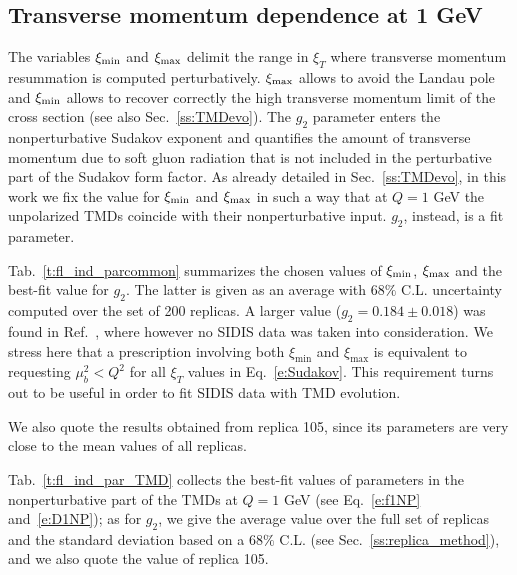 \documentclass[aps,preprintnumbers,showpacs,nofootinbib,superscriptaddress,floatfix]{revtex4}
\newcommand{\AS}[1]{{\textcolor[rgb]{1,0,1}{#1}}}
\newcommand{\T}{\perp}
\newcommand{\bT}{\xi_T}
\newcommand{\bb}{\xi}
\begin{document}
\subsection{Transverse momentum dependence at 1 GeV}
\label{ss:bestfit_TMDs}

The variables $\bb_{\rm min}$ and $\bb_{\rm max}$ delimit the range in $\bT$ where transverse momentum resummation is computed perturbatively. $\bb_{\rm max}$ allows to avoid the Landau pole and $\bb_{\rm min}$ allows to recover correctly the high transverse momentum limit of the cross section (see also Sec.~\ref{ss:TMDevo}).
The $g_2$ parameter enters the nonperturbative Sudakov exponent and
quantifies the amount of transverse momentum 
due to soft gluon radiation that is not included in the
perturbative part of the Sudakov form factor.
As already detailed in Sec.~\ref{ss:TMDevo}, in this work we fix the value for
$\bb_{\rm min}$ and $\bb_{\rm max}$ in such a way that at $Q=1$ GeV the
unpolarized TMDs coincide with their nonperturbative input. $g_2$, instead, is
a fit parameter. 

Tab.~\ref{t:fl_ind_parcommon} summarizes the chosen values of $\bb_{\rm min}$,
$\bb_{\rm max}$ and the best-fit value for $g_2$. The latter is given as an
average with $68\%$ C.L. uncertainty computed over the set of 200 replicas. A
larger value ($g_2 = 0.184 \pm 0.018$) was found in Ref.~\cite{Konychev:2005iy},
where however no SIDIS data was taken into consideration.
We stress here that a prescription involving both $\bb_{\text{min}}$ and
$\bb_{\text{max}}$ is equivalent to requesting $\mu_b^2 < Q^2$ for all $\bb_T$ values in Eq.~\eqref{e:Sudakov}. This requirement turns out
to be useful in order to fit SIDIS data with TMD evolution.

We also quote the results obtained from
replica 105, since its parameters are very close to the
mean values of all replicas. 

Tab.~\ref{t:fl_ind_par_TMD} collects the best-fit values of parameters in the
nonperturbative part of the TMDs at $Q=1$ GeV (see Eq.~\eqref{e:f1NP}
and~\eqref{e:D1NP}); as for $g_2$, we give the average value over the full set
of replicas and the standard deviation based on a $68\%$ C.L. (see
Sec.~\ref{ss:replica_method}), and we also quote the value of replica 105.

\end{document}

